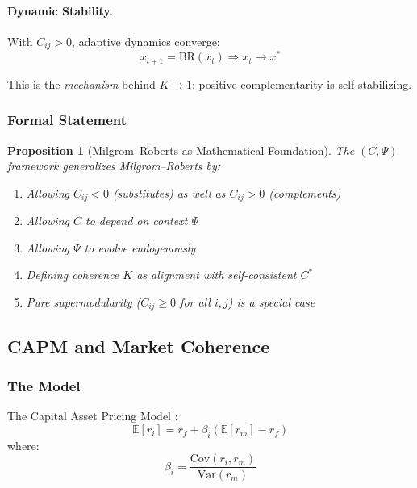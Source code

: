 \documentclass[12pt,a4paper]{article}
\newtheorem{proposition}[theorem]{Proposition}
\begin{document}
\paragraph{Dynamic Stability.}
With $C_{ij} > 0$, adaptive dynamics converge:
\begin{equation}
  x_{t+1} = \text{BR}(x_t) \Rightarrow x_t \to x^*
\end{equation}

This is the \emph{mechanism} behind $K \to 1$: positive complementarity is self-stabilizing.

\subsubsection{Formal Statement}

\begin{proposition}[Milgrom--Roberts as Mathematical Foundation]
The $(C, \Psi)$ framework generalizes Milgrom--Roberts by:
\begin{enumerate}
  \item Allowing $C_{ij} < 0$ (substitutes) as well as $C_{ij} > 0$ (complements)
  \item Allowing $C$ to depend on context $\Psi$
  \item Allowing $\Psi$ to evolve endogenously
  \item Defining coherence $K$ as alignment with self-consistent $C^*$
  \item Pure supermodularity ($C_{ij} \geq 0$ for all $i,j$) is a special case
\end{enumerate}
\end{proposition}

\subsection{CAPM and Market Coherence}
\label{app:capm}

\subsubsection{The Model}

The Capital Asset Pricing Model \citep{sharpe1964,lintner1965}:
\begin{equation}
  \mathbb{E}[r_i] = r_f + \beta_i (\mathbb{E}[r_m] - r_f)
  \label{eq:capm}
\end{equation}
where:
\begin{equation}
  \beta_i = \frac{\text{Cov}(r_i, r_m)}{\text{Var}(r_m)}
\end{equation}
\end{document}
